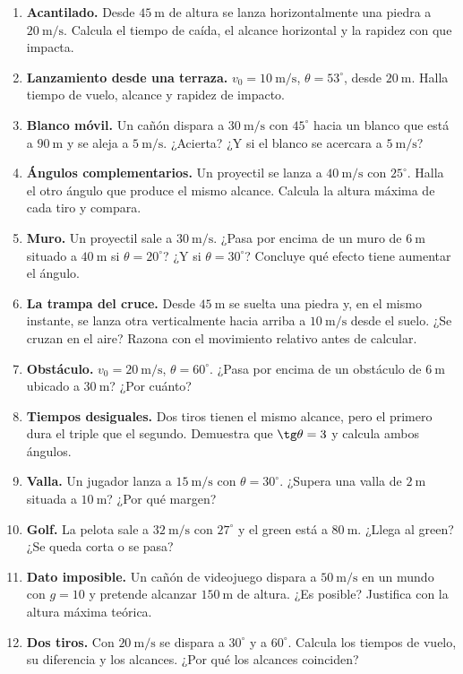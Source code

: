 \documentclass[12pt, letterpaper]{article}
\begin{document}
\begin{enumerate}[leftmargin=*, label=\textbf{\arabic*.}, start=29]
  \item \textbf{Acantilado.} Desde $45\ \text{m}$ de altura se lanza
        horizontalmente una piedra a $20\ \text{m/s}$. Calcula el tiempo de
        caída, el alcance horizontal y la rapidez con que impacta.
  \item \textbf{Lanzamiento desde una terraza.} $v_0=10\ \text{m/s}$,
        $\theta=53^\circ$, desde $20\ \text{m}$. Halla tiempo de vuelo,
        alcance y rapidez de impacto.
  \item \textbf{Blanco móvil.} Un cañón dispara a $30\ \text{m/s}$ con
        $45^\circ$ hacia un blanco que está a $90\ \text{m}$ y se aleja a
        $5\ \text{m/s}$. ¿Acierta? ¿Y si el blanco se acercara a
        $5\ \text{m/s}$?
  \item \textbf{Ángulos complementarios.} Un proyectil se lanza a
        $40\ \text{m/s}$ con $25^\circ$. Halla el otro ángulo que produce el
        mismo alcance. Calcula la altura máxima de cada tiro y compara.
  \item \textbf{Muro.} Un proyectil sale a $30\ \text{m/s}$. ¿Pasa por encima
        de un muro de $6\ \text{m}$ situado a $40\ \text{m}$ si
        $\theta=20^\circ$? ¿Y si $\theta=30^\circ$? Concluye qué efecto tiene
        aumentar el ángulo.
  \item \textbf{La trampa del cruce.} Desde $45\ \text{m}$ se suelta una
        piedra y, en el mismo instante, se lanza otra verticalmente hacia
        arriba a $10\ \text{m/s}$ desde el suelo. ¿Se cruzan en el aire?
        Razona con el movimiento relativo antes de calcular.
  \item \textbf{Obstáculo.} $v_0=20\ \text{m/s}$, $\theta=60^\circ$. ¿Pasa
        por encima de un obstáculo de $6\ \text{m}$ ubicado a $30\ \text{m}$?
        ¿Por cuánto?
  \item \textbf{Tiempos desiguales.} Dos tiros tienen el mismo alcance, pero
        el primero dura el triple que el segundo. Demuestra que
        $\tg\theta=3$ y calcula ambos ángulos.
  \item \textbf{Valla.} Un jugador lanza a $15\ \text{m/s}$ con
        $\theta=30^\circ$. ¿Supera una valla de $2\ \text{m}$ situada a
        $10\ \text{m}$? ¿Por qué margen?
  \item \textbf{Golf.} La pelota sale a $32\ \text{m/s}$ con $27^\circ$ y el
        green está a $80\ \text{m}$. ¿Llega al green? ¿Se queda corta o se
        pasa?
  \item \textbf{Dato imposible.} Un cañón de videojuego dispara a
        $50\ \text{m/s}$ en un mundo con $g=10$ y pretende alcanzar
        $150\ \text{m}$ de altura. ¿Es posible? Justifica con la altura
        máxima teórica.
  \item \textbf{Dos tiros.} Con $20\ \text{m/s}$ se dispara a $30^\circ$ y a
        $60^\circ$. Calcula los tiempos de vuelo, su diferencia y los
        alcances. ¿Por qué los alcances coinciden?
\end{enumerate}
\end{document}
